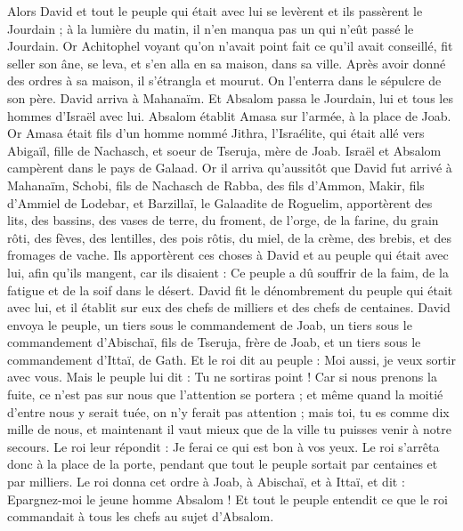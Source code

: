 \begin{multicols}{2}
Alors David et tout le peuple qui était avec lui se levèrent et ils passèrent le Jourdain ; à la lumière du matin, il n'en manqua pas un qui n'eût passé le Jourdain.
Or Achitophel voyant qu'on n'avait point fait ce qu'il avait conseillé, fit seller son âne, se leva, et s'en alla en sa maison, dans sa ville. Après avoir donné des ordres à sa maison, il s'étrangla et mourut. On l'enterra dans le sépulcre de son père.
David arriva à Mahanaïm. Et Absalom passa le Jourdain, lui et tous les hommes d'Israël avec lui.
Absalom établit Amasa sur l'armée, à la place de Joab. Or Amasa était fils d'un homme nommé Jithra, l'Israélite, qui était allé vers Abigaïl, fille de Nachasch, et soeur de Tseruja, mère de Joab.
Israël et Absalom campèrent dans le pays de Galaad.
Or il arriva qu'aussitôt que David fut arrivé à Mahanaïm, Schobi, fils de Nachasch de Rabba, des fils d'Ammon, Makir, fils d'Ammiel de Lodebar, et Barzillaï, le Galaadite de Roguelim,
apportèrent des lits, des bassins, des vases de terre, du froment, de l'orge, de la farine, du grain rôti, des fèves, des lentilles, des pois rôtis,
du miel, de la crème, des brebis, et des fromages de vache. Ils apportèrent ces choses à David et au peuple qui était avec lui, afin qu'ils mangent, car ils disaient : Ce peuple a dû souffrir de la faim, de la fatigue et de la soif dans le désert.
\VerseOne{}David fit le dénombrement du peuple qui était avec lui, et il établit sur eux des chefs de milliers et des chefs de centaines.
David envoya le peuple, un tiers sous le commandement de Joab, un tiers sous le commandement d'Abischaï, fils de Tseruja, frère de Joab, et un tiers sous le commandement d'Ittaï, de Gath. Et le roi dit au peuple : Moi aussi, je veux sortir avec vous.
Mais le peuple lui dit : Tu ne sortiras point ! Car si nous prenons la fuite, ce n'est pas sur nous que l'attention se portera ; et même quand la moitié d'entre nous y serait tuée, on n'y ferait pas attention ; mais toi, tu es comme dix mille de nous, et maintenant il vaut mieux que de la ville tu puisses venir à notre secours.
Le roi leur répondit : Je ferai ce qui est bon à vos yeux. Le roi s'arrêta donc à la place de la porte, pendant que tout le peuple sortait par centaines et par milliers.
Le roi donna cet ordre à Joab, à Abischaï, et à Ittaï, et dit : Epargnez-moi le jeune homme Absalom ! Et tout le peuple entendit ce que le roi commandait à tous les chefs au sujet d'Absalom.

\end{multicols}
